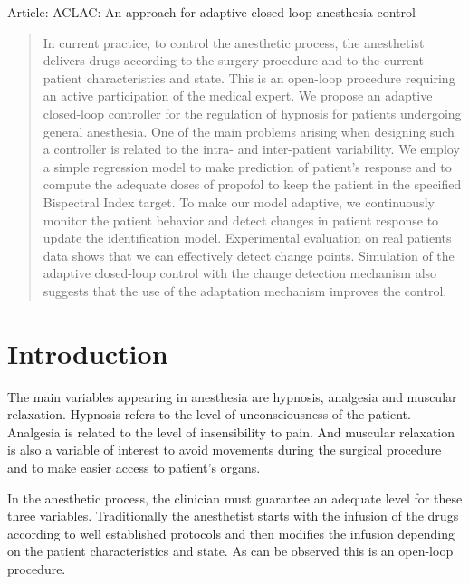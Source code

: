 Article: ACLAC: An approach for adaptive closed-loop anesthesia control

\begin{abstract}
In current practice, to control the anesthetic process, the
anesthetist delivers drugs according to the surgery procedure and
to the current patient characteristics and state.
%
This is an open-loop procedure requiring an active participation of
the medical expert.
%
We propose an adaptive closed-loop controller for the regulation of
hypnosis for patients undergoing general anesthesia.
%
One of the main problems arising when designing such a controller is
related to the intra- and inter-patient variability.
%
We employ a simple regression model to make prediction of patient's
response and to compute the adequate doses of propofol to keep the
patient in the specified Bispectral Index target.
%
To make our model adaptive, we continuously monitor the patient
behavior and detect changes in patient response to update the
identification model.
%
Experimental evaluation on real patients data shows that we can
effectively detect change points. Simulation of the adaptive
closed-loop control with the change detection mechanism also suggests
that the use of the adaptation mechanism improves the control. 
\end{abstract}
\section{Introduction}
The main variables appearing in anesthesia are hypnosis, analgesia and
muscular relaxation. Hypnosis refers to the level of unconsciousness
of the patient. Analgesia is related to the level of insensibility to
pain. And muscular relaxation is also a variable of interest to avoid
movements during the surgical procedure and to make easier access to
patient’s organs.

In the anesthetic process, the clinician must guarantee an adequate level for these three variables.
Traditionally the anesthetist starts with the infusion of the drugs according to well established protocols and then
modifies the infusion depending on the patient characteristics and state.
%
As can be observed this is an open-loop procedure.

